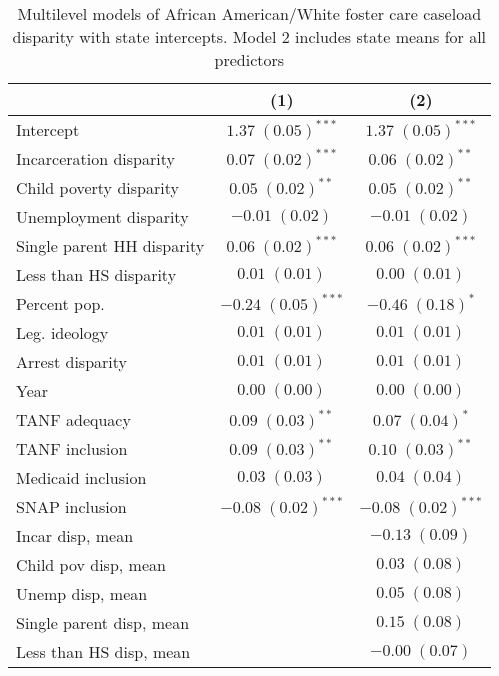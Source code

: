 
\begin{table}
\caption{Multilevel models of African American/White foster care caseload disparity with state intercepts. Model 2 includes state means for all predictors }
\begin{center}
\begin{tabular}{l c c }
\hline
 & (1) & (2) \\
\hline
Intercept                  & $1.37 \; (0.05)^{***}$  & $1.37 \; (0.05)^{***}$  \\
Incarceration disparity    & $0.07 \; (0.02)^{***}$  & $0.06 \; (0.02)^{**}$   \\
Child poverty disparity    & $0.05 \; (0.02)^{**}$   & $0.05 \; (0.02)^{**}$   \\
Unemployment disparity     & $-0.01 \; (0.02)$       & $-0.01 \; (0.02)$       \\
Single parent HH disparity & $0.06 \; (0.02)^{***}$  & $0.06 \; (0.02)^{***}$  \\
Less than HS disparity     & $0.01 \; (0.01)$        & $0.00 \; (0.01)$        \\
Percent pop.               & $-0.24 \; (0.05)^{***}$ & $-0.46 \; (0.18)^{*}$   \\
Leg. ideology              & $0.01 \; (0.01)$        & $0.01 \; (0.01)$        \\
Arrest disparity           & $0.01 \; (0.01)$        & $0.01 \; (0.01)$        \\
Year                       & $0.00 \; (0.00)$        & $0.00 \; (0.00)$        \\
TANF adequacy              & $0.09 \; (0.03)^{**}$   & $0.07 \; (0.04)^{*}$    \\
TANF inclusion             & $0.09 \; (0.03)^{**}$   & $0.10 \; (0.03)^{**}$   \\
Medicaid inclusion         & $0.03 \; (0.03)$        & $0.04 \; (0.04)$        \\
SNAP inclusion             & $-0.08 \; (0.02)^{***}$ & $-0.08 \; (0.02)^{***}$ \\
Incar disp, mean           &                         & $-0.13 \; (0.09)$       \\
Child pov disp, mean       &                         & $0.03 \; (0.08)$        \\
Unemp disp, mean           &                         & $0.05 \; (0.08)$        \\
Single parent disp, mean   &                         & $0.15 \; (0.08)$        \\
Less than HS disp, mean    &                         & $-0.00 \; (0.07)$       \\

\end{tabular}
\end{center}
\end{table}
